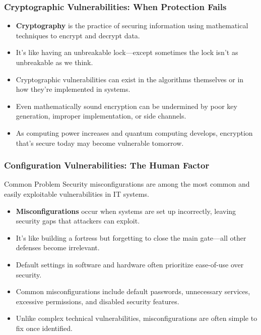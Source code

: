 \documentclass{beamer}
\begin{document}
\begin{frame}
    \frametitle{Cryptographic Vulnerabilities: When Protection Fails}
    
    \begin{itemize}
        \item \textbf{Cryptography} is the practice of securing information using mathematical techniques to encrypt and decrypt data.
        \item It's like having an unbreakable lock—except sometimes the lock isn't as unbreakable as we think.
        \item Cryptographic vulnerabilities can exist in the algorithms themselves or in how they're implemented in systems.
        \item Even mathematically sound encryption can be undermined by poor key generation, improper implementation, or side channels.
        \item As computing power increases and quantum computing develops, encryption that's secure today may become vulnerable tomorrow.
    \end{itemize}
\end{frame}

\begin{frame}
    \frametitle{Configuration Vulnerabilities: The Human Factor}
    
    \begin{alertblock}{Common Problem}
        Security misconfigurations are among the most common and easily exploitable vulnerabilities in IT systems.
    \end{alertblock}
    
    \begin{itemize}
        \item \textbf{Misconfigurations} occur when systems are set up incorrectly, leaving security gaps that attackers can exploit.
        \item It's like building a fortress but forgetting to close the main gate—all other defenses become irrelevant.
        \item Default settings in software and hardware often prioritize ease-of-use over security.
        \item Common misconfigurations include default passwords, unnecessary services, excessive permissions, and disabled security features.
        \item Unlike complex technical vulnerabilities, misconfigurations are often simple to fix once identified.
    \end{itemize}
\end{frame}
\end{document}
